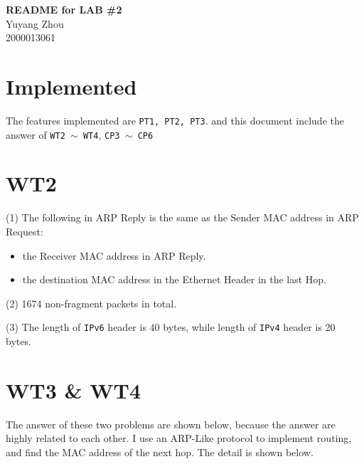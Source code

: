 \documentclass[11pt]{article}
\newcommand{\labid}{2}			%
\newcommand{\name}{Yuyang Zhou} 		%
\newcommand{\id}{2000013061} 	%
\begin{document}
    \pagestyle{fancy}
    \chead{}

    \begin{center}
        {\LARGE \bf README for LAB \#\labid}\\
        {\Large \name}\\
        {\Large \id}\\
    \end{center}

	\section{Implemented}
		\par The features implemented are \texttt{PT1, PT2, PT3}. and this document include the answer of \texttt{WT2 $\sim$ WT4}, \texttt{CP3 $\sim$ CP6}
	
	\section{WT2}
	
		\par (1) The following in ARP Reply is the same as
		the Sender MAC address in ARP Request:
		
		\begin{itemize}
			\item the Receiver MAC address in ARP Reply.
			\item the destination MAC address in the Ethernet Header in the last Hop.
		\end{itemize}
		
		\par (2) 1674 non-fragment packets in total.
		
		\par (3) The length of \texttt{IPv6} header is 40 bytes, while length of \texttt{IPv4} header is 20 bytes.
	\section{WT3 \& WT4}
	
		\par The answer of these two problems are shown below, because the answer are highly related to each other. I use an ARP-Like protocol to implement routing, and find the MAC address of the next hop. The detail is shown below.
		
\end{document}
